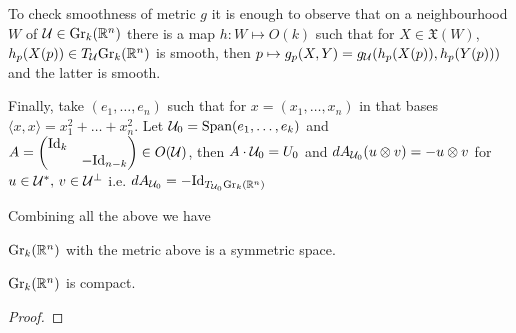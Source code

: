 \documentclass[10pt,a4paper]{article}
\begin{document}
\begin{example}[Grassmanians]
\begin{remark}
To check smoothness of metric $g$ it is enough to observe that on a neighbourhood $W$ of $\mathcal{U}\in \text{Gr}_k(\mathbb{R}^n)$ there is a map $h:W\mapsto O(k)$ such that for $X\in \mathfrak{X}(W)$, $h_p(X(p))\in T_{\mathcal{U}}\text{Gr}_k(\mathbb{R}^n)$ is smooth, then $p\mapsto g_p(X,Y) = g_{\mathcal{U}}(h_p(X(p)), h_p(Y(p)))$ and the latter is smooth.
\end{remark}

Finally, take $(e_1,\ldots,e_n)$ such that for $x = (x_1,\ldots,x_n)$ in that bases $\langle x,x\rangle = x_1^2 + \ldots + x_n^2$. Let $\mathcal{U}_0 = \text{Span}(e_1,\ldots,e_k)$ and $A=\begin{pmatrix}
\text{Id}_k & \\
& -\text{Id}_{n-k}
\end{pmatrix}\in O(\mathcal{U})$, then $A\cdot \mathcal{U}_0 = U_0$ and $dA_{\mathcal{U}_0}(u\otimes v) = -u\otimes v$ for $u\in \mathcal{U}^*, \, v\in \mathcal{U}^\perp$ i.e. $dA_{\mathcal{U}_0} = -\text{Id}_{T_{\mathcal{U}_0}\text{Gr}_k(\mathbb{R}^n)}$
\end{example}
Combining all the above we have 
\begin{prop}
$\text{Gr}_k(\mathbb{R}^n)$ with the metric above is a symmetric space.
\end{prop}
\begin{prop}
$\text{Gr}_k(\mathbb{R}^n)$ is compact.
\end{prop}
\begin{proof}

\end{proof}
\end{document}
